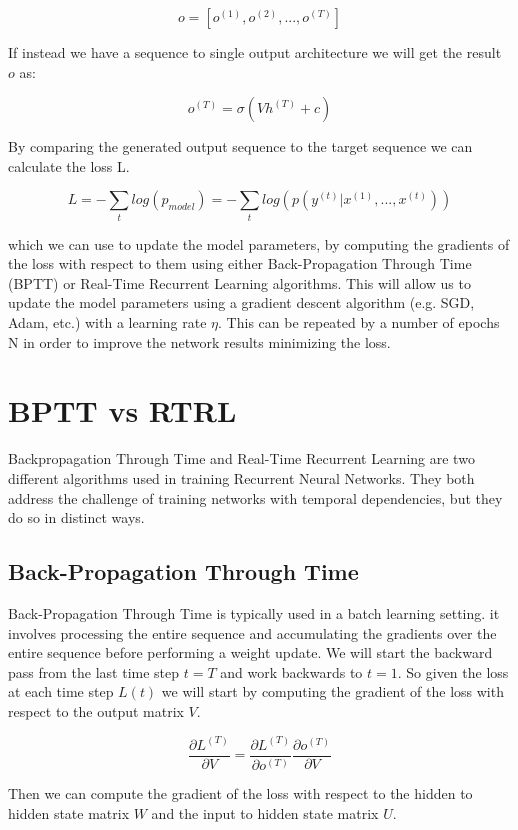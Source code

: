 $$ o = \left[ o^{(1)},  o^{(2)}, ...,  o^{(T)} \right]  $$

\noindent If instead we have a sequence to single output architecture we will get the result $o$ as:

$$ o^{(T)} = \sigma \left(V h^{(T)} + c \right) $$

\noindent By comparing the generated output sequence to the target sequence we can calculate the loss L. 

$$L = - \sum_{t} log (p_{model}) = - \sum_{t} log \left( p \left( y^{(t)} | x^{(1)}, ..., x^{(t)} \right) \right)$$

\noindent which we can use to update the model parameters, by computing the gradients of the loss with respect to them using either Back-Propagation Through Time (BPTT) or Real-Time Recurrent Learning algorithms. This will allow us to update the model parameters using a gradient descent algorithm (e.g. SGD, Adam, etc.) with a learning rate $\eta$. This can be repeated by a number of epochs N in order to improve the network results minimizing the loss.


\section{BPTT vs RTRL}

Backpropagation Through Time and Real-Time Recurrent Learning are two different algorithms used in training Recurrent Neural Networks. They both address the challenge of training networks with temporal dependencies, but they do so in distinct ways.

\subsection{Back-Propagation Through Time}

Back-Propagation Through Time is typically used in a batch learning setting. it involves processing the entire sequence and accumulating the gradients over the entire sequence before performing a weight update. We will start the backward pass from the last time step $t = T$ and work backwards to $t = 1$. So given the loss at each time step $L(t)$ we will start by computing the gradient of the loss with respect to the output matrix $V$.

$$ \frac{\partial L^{(T)}}{\partial V } = \frac{\partial L^{(T)}}{\partial o^{(T)} } \frac{\partial o^{(T)}}{\partial V } $$


\noindent Then we can compute the gradient of the loss with respect to the hidden to hidden state matrix $W$ and the input to hidden state matrix $U$.

